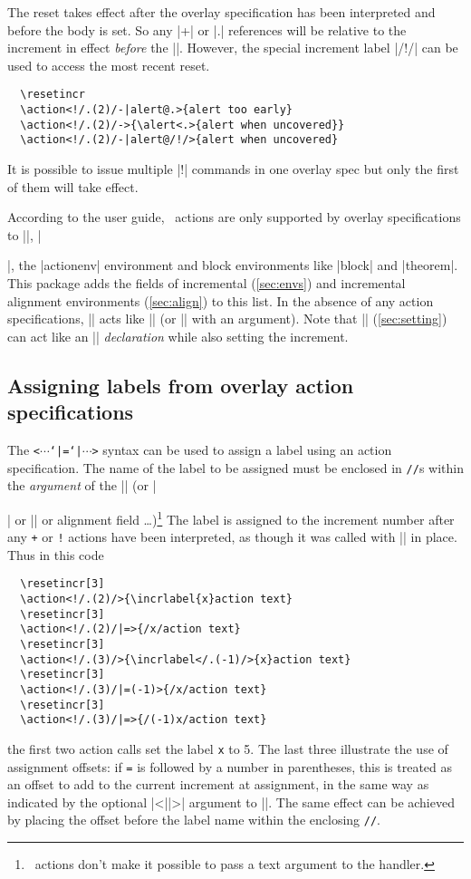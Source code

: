 \documentclass[a4paper]{ltxdoc}
\begin{document}
The reset takes effect after the overlay specification has been interpreted and
before the body is set.  So any |+| or |.| references will be relative to the
increment in effect \emph{before} the |\action|.  However, the special increment
label |/!/| can be used to access the most recent reset.  \example
\begin{verbatim}
  \resetincr
  \action<!/.(2)/-|alert@.>{alert too early}
  \action<!/.(2)/->{\alert<.>{alert when uncovered}}
  \action<!/.(2)/-|alert@/!/>{alert when uncovered}
\end{verbatim}
It is possible to issue multiple |!| commands in one overlay spec but only the
first of them will take effect.

According to the user guide, \beamer\ actions are only supported by overlay
specifications to |\action|, |\item|, the |actionenv| environment and block
environments like |block| and |theorem|.  This package adds the fields of
incremental (\cref{sec:envs}) and incremental alignment environments
(\cref{sec:align}) to this list.  In the absence of any action specifications,
|\action| acts like |\uncover| (or |\onslide| with an argument).  Note that
|\fromslide| (\cref{sec:setting}) can act like an |\onslide| \emph{declaration} while
also setting the increment.

\subsection{Assigning labels from overlay action specifications} \label{sec:actions:=}

The \texttt{<$\cdots$\char`|=}\texttt{\char`|$\cdots$>} syntax can
be used to assign a label using an action specification.  The name of the label
to be assigned must be enclosed in \texttt{//}s within the \emph{argument} of
the |\action| (or |\item| or |\next| or alignment field
\dots)\footnote{\beamer\ actions don't make it possible to pass a text argument
  to the handler.}  The label is assigned to the increment number after any
\texttt{+} or \texttt{!} actions have been interpreted, as though it was called
with |\incrlabel| in place.  Thus in this code \example
\begin{verbatim}
  \resetincr[3]
  \action<!/.(2)/>{\incrlabel{x}action text}
  \resetincr[3]
  \action<!/.(2)/|=>{/x/action text}
  \resetincr[3]
  \action<!/.(3)/>{\incrlabel</.(-1)/>{x}action text}
  \resetincr[3]
  \action<!/.(3)/|=(-1)>{/x/action text}
  \resetincr[3]
  \action<!/.(3)/|=>{/(-1)x/action text}
\end{verbatim}
the first two action calls set the label \texttt{x} to 5.  The last three
illustrate the use of assignment offsets: if \texttt{=} is followed by a number
in parentheses, this is treated as an offset to add to the current increment at
assignment, in the same way as indicated by the optional |<||>|
argument to |\incrlabel|.  The same effect can be achieved by placing the offset
before the label name within the enclosing \texttt{//}.
\end{document}
